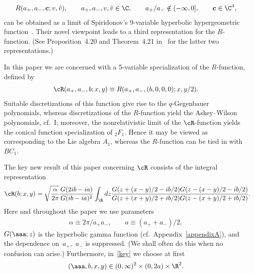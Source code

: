 \begin{gather}\label{Rdef}
R(a_{+},a_{-},{\bf c};v,\hat{v}),\qquad a_{+}, a_{-},v,\hat{v}\in\C,\qquad a_{+}/a_{-}\notin (-\infty,0],\qquad {\bf c}\in\C^4,
\end{gather}
can be obtained as a limit of Spiridonov's 9-variable hyperbolic hypergeometric function~\cite{spir}. Their novel viewpoint leads to a third representation for the $R$-function. (See Proposition~4.20 and Theorem~4.21 in~\cite{bust} for the latter two representations.)

In this paper we are concerned with a 5-variable specialization of the $R$-function, def\/ined by
\begin{gather}\label{cRdef}
\cR(a_{+},a_{-},b;x,y)\equiv R(a_{+},a_{-},(b,0,0,0);x,y/2).
\end{gather}
Suitable discretizations of this function give rise to the $q$-Gegenbauer polynomials, whereas discretizations of the $R$-function yield the Askey--Wilson polynomials, cf.~I; moreover, the nonrelativistic limit of the $\cR$-function yields the conical function specialization of $_2F_1$. Hence it may be viewed as corresponding to the Lie algebra $A_1$, whereas the $R$-function can be tied in with $BC_1$.

The key new result of this paper concerning $\cR$ consists of the integral representation
\begin{gather}\label{key}
\cR(b;x,y)=\sqrt{\frac{\alpha}{2\pi}}\frac{G(2ib-ia)}{G(ib-ia)^2}\int_{\R}dz \frac{G(z+ (x-y)/2-ib/2)G(z- (x-y)/2-ib/2)}{G(z+ (x+y)/2+ib/2)G(z- (x+y)/2+ib/2)}.
\!\!\!
\end{gather}
Here and throughout the paper we use parameters
\begin{gather}\label{aconv}
\alpha\equiv 2\pi/a_+a_-,\qquad a\equiv (a_++a_-)/2,
\end{gather}
$G(\aaa;z)$ is the hyperbolic gamma function (cf.~Appendix~\ref{appendixA}), and  the dependence on~$a_{+}$,~$a_{-}$ is suppressed. (We shall often do this when no confusion can arise.) Furthermore, in~\eqref{key} we choose at f\/irst
\begin{gather}\label{first}
(\aaa,b,x,y)\in(0,\infty)^2\times(0,2a)\times\R^2.
\end{gather}

